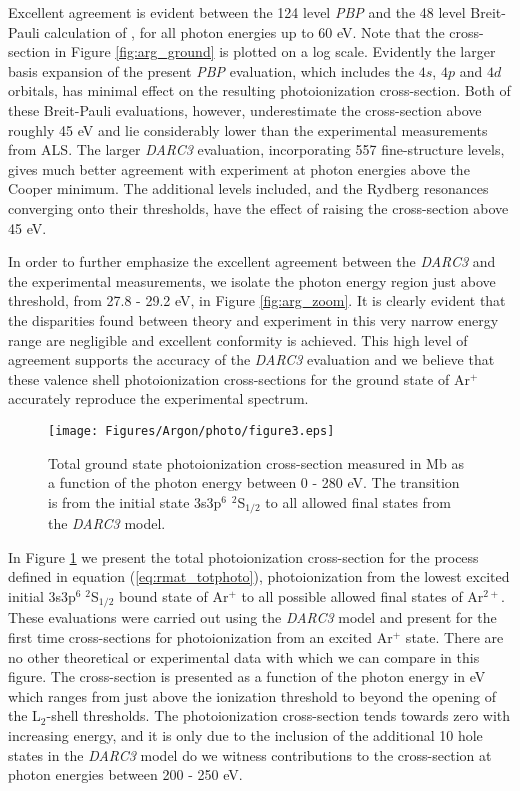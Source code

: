 Excellent agreement is evident between the 124 level \textit{PBP} and the 48 level Breit-Pauli calculation of \citet{2011PhRvA..84a3413C}, for all photon energies up to 60 eV. Note that the cross-section in Figure \ref{fig:arg_ground} is plotted on a log scale. Evidently the larger basis expansion of the present \textit{PBP} evaluation, which includes the $4s$, $4p$ and $4d$ orbitals, has minimal effect on the resulting photoionization cross-section. Both of these Breit-Pauli evaluations, however, underestimate the cross-section above roughly 45 eV and lie considerably lower than the experimental measurements from ALS. The larger \textit{DARC3} evaluation, incorporating 557 fine-structure levels, gives much better agreement with experiment at photon energies above the Cooper minimum. The additional levels included, and the Rydberg resonances converging onto their thresholds, have the effect of raising the cross-section above 45 eV.

In order to further emphasize the excellent agreement between the \textit{DARC3} and the experimental measurements, we isolate the photon energy region just above threshold, from 27.8 - 29.2 eV, in Figure \ref{fig:arg_zoom}. It is clearly evident that the disparities found between theory and experiment in this very narrow energy range are negligible and excellent conformity is achieved. This high level of agreement supports the accuracy of the \textit{DARC3} evaluation and we believe that these valence shell photoionization cross-sections for the ground state of Ar$^{+}$ accurately reproduce the experimental spectrum. 

%
\begin{figure}
\texttt{[image: Figures/Argon/photo/figure3.eps]}
\caption{Total ground state photoionization cross-section measured in Mb as a function of the photon energy between 0 - 280 eV. The transition is from the initial state 3s3p$^6$ $^2$S$_{1/2}$ to all allowed final states from the \textit{DARC3} model. \label{fig:arg_excited}}
\end{figure}
%

In Figure \ref{fig:arg_excited} we present the total photoionization cross-section for the process defined in equation (\ref{eq:rmat_totphoto}), photoionization from the lowest excited initial 3s3p$^6\; ^2$S$_{1/2}$ bound state of Ar$^{+}$ to all possible allowed final states of Ar$^{2+}$. These evaluations were carried out using the \textit{DARC3} model and present for the first time cross-sections for photoionization from an excited Ar$^{+}$ state. There are no other theoretical or experimental data with which we can compare in this figure. The cross-section is presented as a function of the photon energy in eV which ranges from just above the ionization threshold to beyond the opening of the L$_{2}$-shell thresholds. The photoionization cross-section tends towards zero with increasing energy, and it is only due to the inclusion of the additional 10 hole states in the \textit{DARC3} model do we witness contributions to the cross-section at photon energies between 200 - 250 eV. 


